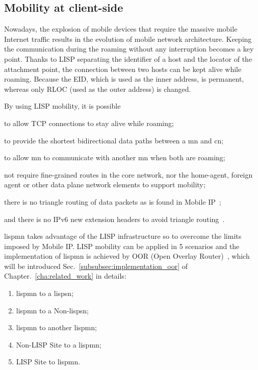 \subsection{Mobility at client-side}
\label{subsubsec:mobility_user}
Nowadays, the explosion of mobile devices that require the massive mobile Internet traffic results in the evolution of mobile network architecture. Keeping the communication during the roaming without any interruption becomes a key point. Thanks to LISP separating the identifier of a host and the locator of the attachment point, the connection between two hosts can be kept alive while roaming. Because the EID, which is used as the inner address, is permanent, whereas only RLOC (used as the outer address) is changed. 

By using LISP mobility, it is possible 
\begin{inparaenum}[1)]
	\item to allow TCP connections to stay alive while roaming;
	\item to provide the shortest bidirectional data paths between a \acrfull{mn} and \acrfull{cn};
	\item to allow \acrshort{mn} to communicate with another \acrshort{mn} when both are roaming;
	\item not require fine-grained routes in the core network, nor the home-agent, foreign agent or other data plane network elements to support mobility;
	\item there is no triangle routing of data packets as is found in Mobile IP~\cite{perkins2002rfc3344};
	\item and there is no IPv6 new extension headers to avoid triangle routing~\cite{johnson2004rfc}.
\end{inparaenum}
\acrfull{lispmn} takes advantage of the LISP infrastructure so to overcome the limits imposed by Mobile IP. LISP mobility can be applied in 5 scenarios and the implementation of \acrshort{lispmn} is achieved by OOR (Open Overlay Router)~\cite{OOR}, which will be introduced Sec.~\ref{subsubsec:implementation_oor} of Chapter.~\ref{cha:related_work} in details: 
\begin{enumerate}[noitemsep,topsep=0pt]
	\item \acrshort{lispmn} to a \acrfull{lispsn};
	\item \acrshort{lispmn} to a Non-\acrshort{lispsn};
	\item \acrshort{lispmn} to another \acrshort{lispmn};
	\item Non-LISP Site to a \acrshort{lispmn};
	\item LISP Site to \acrshort{lispmn}.
\end{enumerate}



